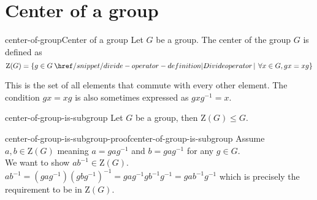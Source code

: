 \documentclass[preview]{standalone}
\begin{document}
\section{Center of a group}

\begin{snippetdefinition}{center-of-group}{Center of a group}
    Let \(G\) be a group. The center of the group \(G\) is defined as
    \[
        \text{Z}(G) = \{
            g \in G \divides \forall x \in G, gx = xg
        \}
    \]

    This is the set of all elements that commute with every other element.
    The condition \(gx=xg\) is also sometimes expressed as \(gxg^{-1} = x\).
\end{snippetdefinition}

\begin{snippettheorem}{center-of-group-is-subgroup}{}
    Let \(G\) be a group, then \(\text{Z}(G) \leq G\).
\end{snippettheorem}

\begin{snippetproof}{center-of-group-is-subgroup-proof}{center-of-group-is-subgroup}{}
    Assume \(a, b \in \text{Z}(G)\) meaning \(a = gag^{-1}\) and \(b = gag^{-1}\) for any \(g \in G\). \\
    We want to show \(ab^{-1} \in \text{Z}(G)\).
    \(ab^{-1} = (gag^{-1}){(gbg^{-1})}^{-1} = gag^{-1}gb^{-1}g^{-1}
    = g ab^{-1} g^{-1}\) which is precisely the requirement to be in \(\text{Z}(G)\).
\end{snippetproof}

\end{document}
